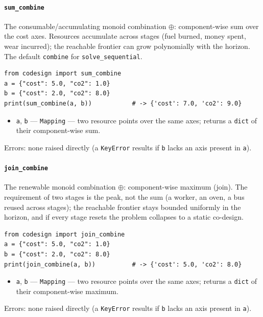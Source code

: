 \documentclass[11pt,a4paper]{article}
\begin{document}
\paragraph{\texttt{sum\_combine}}\label{ref:sequential:sum_combine}
The consumable/accumulating monoid combination $\oplus$: component-wise sum
over the cost axes. Resources accumulate across stages (fuel burned, money
spent, wear incurred); the reachable frontier can grow polynomially with the
horizon. The default \texttt{combine} for \texttt{solve\_sequential}.
\begin{lstlisting}
from codesign import sum_combine
a = {"cost": 5.0, "co2": 1.0}
b = {"cost": 2.0, "co2": 8.0}
print(sum_combine(a, b))           # -> {'cost': 7.0, 'co2': 9.0}
\end{lstlisting}
\begin{itemize}[nosep]
  \item \texttt{a}, \texttt{b} --- \texttt{Mapping} --- two resource points
    over the same axes; returns a \texttt{dict} of their component-wise sum.
\end{itemize}
Errors: none raised directly (a \texttt{KeyError} results if \texttt{b}
lacks an axis present in \texttt{a}).

\paragraph{\texttt{join\_combine}}\label{ref:sequential:join_combine}
The renewable monoid combination $\oplus$: component-wise maximum (join).
The requirement of two stages is the peak, not the sum (a worker, an oven, a
bus reused across stages); the reachable frontier stays bounded uniformly in
the horizon, and if every stage resets the problem collapses to a static
co-design.
\begin{lstlisting}
from codesign import join_combine
a = {"cost": 5.0, "co2": 1.0}
b = {"cost": 2.0, "co2": 8.0}
print(join_combine(a, b))          # -> {'cost': 5.0, 'co2': 8.0}
\end{lstlisting}
\begin{itemize}[nosep]
  \item \texttt{a}, \texttt{b} --- \texttt{Mapping} --- two resource points
    over the same axes; returns a \texttt{dict} of their component-wise
    maximum.
\end{itemize}
Errors: none raised directly (a \texttt{KeyError} results if \texttt{b}
lacks an axis present in \texttt{a}).
\end{document}

